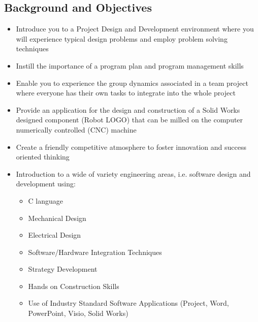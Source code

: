 \documentclass{article}
\begin{document}
\subsection{Background and Objectives}
\begin{itemize}
  \item Introduce you to a Project Design and Development environment where you will experience typical design problems and employ problem solving techniques
  \item Instill the importance of a program plan and program management skills
\item Enable you to experience the group dynamics associated in a team project where everyone has their own tasks to integrate into the whole project
\item Provide an application for the design and construction of a Solid Works designed component (Robot LOGO) that can be milled on the computer numerically controlled (CNC) machine
\item Create a friendly competitive atmosphere to foster innovation and success oriented thinking
\item Introduction to a wide of variety engineering areas, i.e. software design and development using: 
    \begin{itemize}
        \item C language
        \item Mechanical Design
        \item Electrical Design
        \item Software/Hardware Integration Techniques
        \item Strategy Development
        \item Hands on Construction Skills
        \item Use of Industry Standard Software Applications (Project, Word, PowerPoint, Visio, Solid Works) 
    \end{itemize}
\end{itemize}
\end{document}
